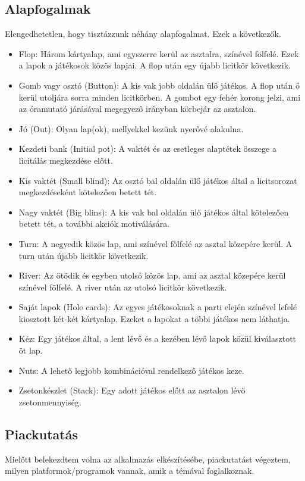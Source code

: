 \subsection{Alapfogalmak}
Elengedhetetlen, hogy tisztázzunk néhány alapfogalmat. Ezek a következők\cite{harrington}.
\begin{itemize}
\item Flop: Három kártyalap, ami egyszerre kerül az asztalra, színével fölfelé. Ezek a lapok a játékosok közös lapjai. A flop után egy újabb licitkör következik.
\item Gomb vagy osztó (Button): A kis vak jobb oldalán ülő játékos. A flop után ő kerül utoljára sorra minden licitkörben. A gombot egy fehér korong jelzi, ami az óramutató járásával megegyező irányban körbejár az asztalon.
\item Jó (Out): Olyan lap(ok), mellyekkel kezünk nyerővé alakulna.
\item Kezdeti bank (Initial pot): A vaktét és az esetleges alaptétek összege a licitálás megkezdése előtt.
\item Kis vaktét (Small blind): Az osztó bal oldalán ülő játékos által a licitsorozat megkezdéseként kötelezően betett tét.
\item Nagy vaktét (Big blins): A kis vak bal oldalán ülő játékos által kötelezően betett tét, a további akciók motiválására.
\item Turn: A negyedik közös lap, ami színével fölfelé az asztal közepére kerül. A turn után újabb licitkör következik.
\item River: Az ötödik és egyben utolsó közös lap, ami az asztal közepére kerül színével fölfelé. A river után az utolsó licitkör következik.
\item Saját lapok (Hole cards): Az egyes játékosoknak a parti elején színével lefelé kiosztott két-két kártyalap. Ezeket a lapokat a többi játékos nem láthatja.
\item Kéz: Egy játékos által, a lent lévő és a kezében lévő lapok közül kiválasztott öt lap.
\item Nuts: A lehető legjobb kombinációval rendelkező játékos keze.
\item Zsetonkészlet (Stack): Egy adott játékos előtt az asztalon lévő zsetonmennyiség.
\end{itemize}

\subsection{Piackutatás}
Mielőtt belekezdtem volna az alkalmazás elkészítésébe, piackutatást végeztem, milyen platformok/programok vannak, amik a témával foglalkoznak.

